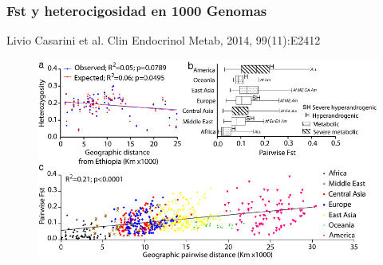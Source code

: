 \documentclass{beamer}\usepackage[]{graphicx}\usepackage[]{color}
\begin{document}
\begin{frame}[fragile]
\frametitle{Fst y heterocigosidad en 1000 Genomas}

Livio Casarini  et al. Clin Endocrinol Metab, 2014, 99(11):E2412

\begin{figure}[htbp]
\begin{center}
\includegraphics[width=1\linewidth]{1000gFst.png}
\end{center}
\end{figure}
\end{frame}
\end{document}
